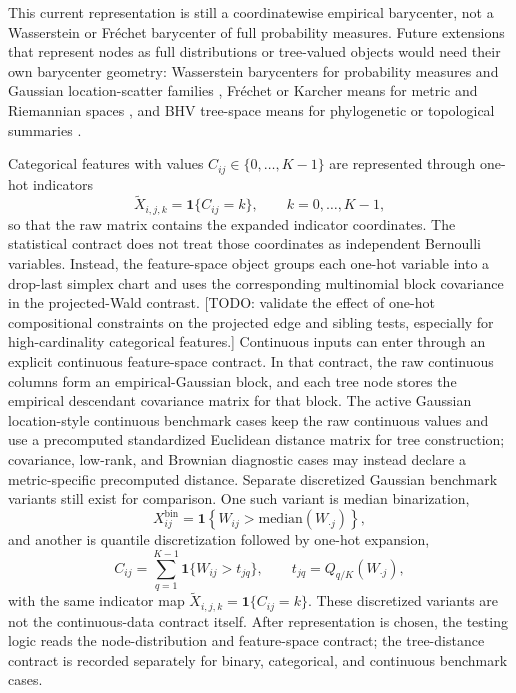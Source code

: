 This current representation is still a coordinatewise empirical barycenter, not
a Wasserstein or Fr{\'e}chet barycenter of full probability measures. Future
extensions that represent nodes as full distributions or tree-valued objects
would need their own barycenter geometry: Wasserstein barycenters for
probability measures and Gaussian location-scatter families
\citep{agueh2011barycenters,cuturi2014fast,alvarez2016fixed,carlier2024quantitative},
Fr{\'e}chet or Karcher means for metric and Riemannian spaces
\citep{frechet1948elements,karcher1977riemannian}, and BHV tree-space means
for phylogenetic or topological summaries
\citep{miller2015polyhedral,brown2020mean,lammers2024statistics}.

Categorical features with values $C_{ij} \in \{0,\dots,K-1\}$ are represented
through one-hot indicators
\begin{equation}
\tilde{X}_{i,j,k} = \mathbf{1}\{C_{ij} = k\},
\qquad
k = 0,\dots,K-1,
\end{equation}
so that the raw matrix contains the expanded indicator coordinates. The
statistical contract does not treat those coordinates as independent Bernoulli
variables. Instead, the feature-space object groups each one-hot variable into
a drop-last simplex chart and uses the corresponding multinomial block
covariance in the projected-Wald contrast.
[TODO: validate the effect of one-hot compositional constraints on the
projected edge and sibling tests, especially for high-cardinality categorical
features.]
Continuous inputs can enter through an explicit continuous feature-space
contract. In that contract, the raw continuous columns form an
empirical-Gaussian block, and each tree node stores the empirical descendant
covariance matrix for that block. The active Gaussian location-style continuous
benchmark cases keep the raw continuous values and use a precomputed
standardized Euclidean distance matrix for tree construction; covariance,
low-rank, and Brownian diagnostic cases may instead declare a metric-specific
precomputed distance. Separate discretized Gaussian benchmark variants still
exist for comparison. One such variant is median binarization,
\begin{equation}
X_{ij}^{\mathrm{bin}}
=
\mathbf{1}\!\left\{
W_{ij} > \mathrm{median}(W_{\cdot j})
\right\},
\end{equation}
and another is quantile discretization followed by one-hot expansion,
\begin{equation}
C_{ij}
=
\sum_{q=1}^{K-1} \mathbf{1}\{W_{ij} > t_{jq}\},
\qquad
t_{jq} = Q_{q/K}(W_{\cdot j}),
\end{equation}
with the same indicator map
$\tilde{X}_{i,j,k} = \mathbf{1}\{C_{ij} = k\}$. These discretized variants are
not the continuous-data contract itself. After representation is chosen, the
testing logic reads the node-distribution and feature-space contract; the
tree-distance contract is recorded separately for binary, categorical, and
continuous benchmark cases.
